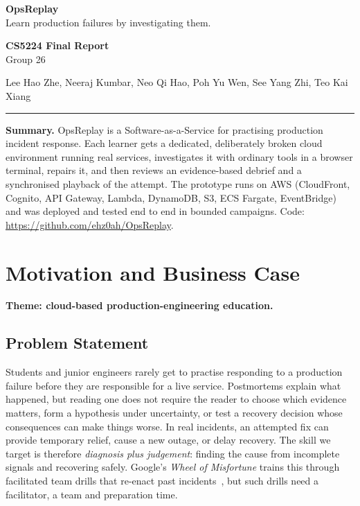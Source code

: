 \documentclass[11pt,a4paper]{article}
\newcommand{\Group}{Group 26}
\newcommand{\Members}{Lee Hao Zhe, Neeraj Kumbar, Neo Qi Hao, Poh Yu Wen, See Yang Zhi, Teo Kai Xiang}
\newcommand{\Repo}{\url{https://github.com/ehz0ah/OpsReplay}}
\begin{document}
\noindent
\begin{minipage}[t]{0.60\linewidth}
  \raggedright
  {\LARGE\bfseries OpsReplay}\\[3pt]
  {\small Learn production failures by investigating them.}
\end{minipage}\hfill
\begin{minipage}[t]{0.38\linewidth}
  \raggedleft\small
  \textbf{CS5224 Final Report}\\[2pt]
  \Group
\end{minipage}
\par\vspace{5pt}
{\footnotesize\Members\par}
\vspace{2pt}\hrule\vspace{4pt}

{\small\textbf{Summary.} OpsReplay is a Software-as-a-Service for practising
production incident response. Each learner gets a dedicated, deliberately
broken cloud environment running real services, investigates it with ordinary
tools in a browser terminal, repairs it, and then reviews an evidence-based
debrief and a synchronised playback of the attempt. The prototype runs on AWS
(CloudFront, Cognito, API Gateway, Lambda, DynamoDB, S3, ECS Fargate,
EventBridge) and was deployed and tested end to end in bounded campaigns.
Code: \Repo.\par}




\section{Motivation and Business Case}
\textbf{Theme: cloud-based production-engineering education.}

\subsection{Problem Statement}
Students and junior engineers rarely get to practise responding to a
production failure before they are responsible for a live service. Postmortems
explain what happened, but reading one does not require the reader to choose
which evidence matters, form a hypothesis under uncertainty, or test a recovery
decision whose consequences can make things worse. In real incidents, an
attempted fix can provide temporary relief, cause a new outage, or delay
recovery. The skill we target is therefore \emph{diagnosis plus judgement}:
finding the cause from incomplete signals and recovering safely.
Google's \emph{Wheel of Misfortune} trains this through facilitated team drills
that re-enact past incidents~\cite{sre}, but such drills need a facilitator,
a team and preparation time.
\end{document}
